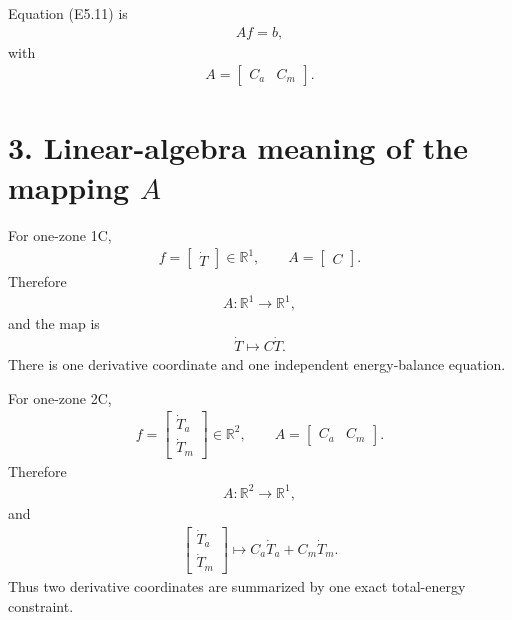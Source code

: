 \documentclass[11pt]{article}
\begin{document}
Equation (E5.11) is
\begin{align}
\boxed{Af=b,}
\tag{E5.13}
\end{align}
with
\begin{align}
\boxed{A=\begin{bmatrix}C_a&C_m\end{bmatrix}.}
\tag{E5.14}
\end{align}

\section*{3. Linear-algebra meaning of the mapping \(A\)}

For one-zone 1C,
\begin{align}
f=\begin{bmatrix}\dot T\end{bmatrix}\in\mathbb R^1,
\qquad
A=\begin{bmatrix}C\end{bmatrix}.
\end{align}
Therefore
\begin{align}
\boxed{A:\mathbb R^1\rightarrow\mathbb R^1,}
\tag{E5.15}
\end{align}
and the map is
\begin{align}
\boxed{\dot T\longmapsto C\dot T.}
\tag{E5.16}
\end{align}
There is one derivative coordinate and one independent energy-balance equation.

For one-zone 2C,
\begin{align}
f=\begin{bmatrix}\dot T_a\\\dot T_m\end{bmatrix}\in\mathbb R^2,
\qquad
A=\begin{bmatrix}C_a&C_m\end{bmatrix}.
\end{align}
Therefore
\begin{align}
\boxed{A:\mathbb R^2\rightarrow\mathbb R^1,}
\tag{E5.17}
\end{align}
and
\begin{align}
\boxed{\begin{bmatrix}\dot T_a\\\dot T_m\end{bmatrix}\longmapsto C_a\dot T_a+C_m\dot T_m.}
\tag{E5.18}
\end{align}
Thus two derivative coordinates are summarized by one exact total-energy constraint.
\end{document}
